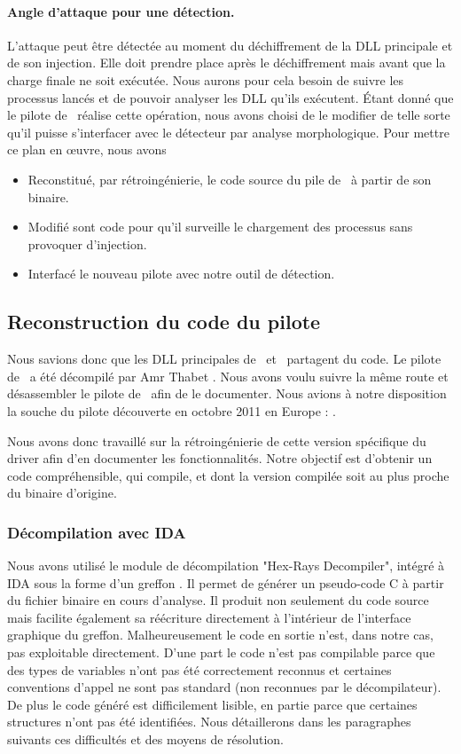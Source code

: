 \paragraph{Angle d'attaque pour une détection.}
L'attaque peut être détectée au moment du déchiffrement de la DLL principale et de son injection.
Elle doit prendre place après le déchiffrement mais avant que la charge finale ne soit exécutée.
Nous aurons pour cela besoin de suivre les processus lancés et de pouvoir analyser les DLL qu'ils exécutent.
Étant donné que le pilote de \duqu\ réalise cette opération, nous avons choisi de le modifier de telle sorte qu'il puisse s'interfacer avec le détecteur par analyse morphologique.
Pour mettre ce plan en \oe uvre, nous avons
\begin{itemize}
 \item Reconstitué, par rétroingénierie, le code source du pile de \duqu\ à partir de son binaire.
 \item Modifié sont code pour qu'il surveille le chargement des processus sans provoquer d'injection.
 \item Interfacé le nouveau pilote avec notre outil de détection.
\end{itemize}

\subsection{Reconstruction du code du pilote}
Nous savions donc que les DLL principales de \duqu\ et \stux\ partagent du code.
Le pilote de \stux\ a été décompilé par Amr Thabet \cite{ThabetDriver}.
Nous avons voulu suivre la même route et désassembler le pilote de \duqu\ afin de le documenter.
Nous avions à notre disposition la souche du pilote découverte en octobre 2011 en Europe : \driver.

Nous avons donc travaillé sur la rétroingénierie de cette version spécifique du driver afin d’en documenter les fonctionnalités. 
Notre objectif est d’obtenir un code compréhensible, qui compile, et dont la version compilée soit au plus proche du binaire d'origine.

\subsubsection{Décompilation avec IDA}
Nous avons utilisé le module de décompilation "Hex-Rays Decompiler", intégré à IDA sous la forme d’un greffon \cite{IDADecompiler}.
Il permet de générer un pseudo-code C à partir du fichier binaire en cours d’analyse.
Il produit non seulement du code source mais facilite également sa réécriture directement à l’intérieur de l’interface graphique du greffon. 
Malheureusement le code en sortie n’est, dans notre cas, pas exploitable directement. 
D’une part le code n’est pas compilable parce que des types de variables n’ont pas été correctement reconnus et certaines conventions d’appel ne sont pas standard (non reconnues par le décompilateur). 
De plus le code généré est difficilement lisible, en partie parce que certaines structures n’ont pas été identifiées.
Nous détaillerons dans les paragraphes suivants ces difficultés et des moyens de résolution.

